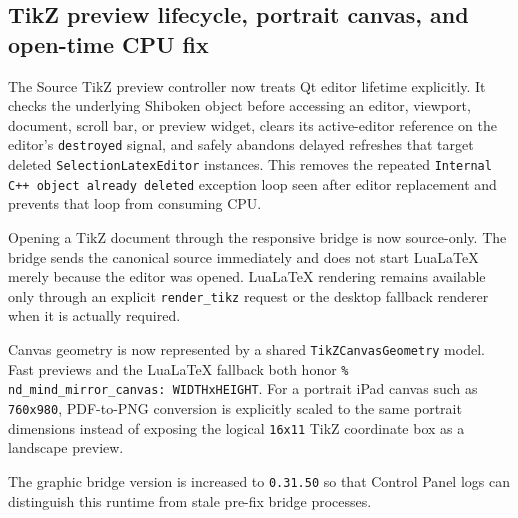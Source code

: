 \documentclass[a4paper]{article}
\title{}
\date{}
\author{Mohammad Rahmani}
\begin{document}
   \maketitle

   \begin{preview}
      \section*{TikZ preview lifecycle, portrait canvas, and open-time CPU fix}

      The Source TikZ preview controller now treats Qt editor lifetime explicitly. It checks the underlying Shiboken object before accessing an editor, viewport, document, scroll bar, or preview widget, clears its active-editor reference on the editor's \texttt{destroyed} signal, and safely abandons delayed refreshes that target deleted \texttt{SelectionLatexEditor} instances. This removes the repeated \texttt{Internal C++ object already deleted} exception loop seen after editor replacement and prevents that loop from consuming CPU.

      Opening a TikZ document through the responsive bridge is now source-only. The bridge sends the canonical source immediately and does not start LuaLaTeX merely because the editor was opened. LuaLaTeX rendering remains available only through an explicit \texttt{render\_tikz} request or the desktop fallback renderer when it is actually required.

      Canvas geometry is now represented by a shared \texttt{TikZCanvasGeometry} model. Fast previews and the LuaLaTeX fallback both honor \texttt{\% nd\_mind\_mirror\_canvas: WIDTHxHEIGHT}. For a portrait iPad canvas such as \texttt{760x980}, PDF-to-PNG conversion is explicitly scaled to the same portrait dimensions instead of exposing the logical \texttt{16x11} TikZ coordinate box as a landscape preview.

      The graphic bridge version is increased to \texttt{0.31.50} so that Control Panel logs can distinguish this runtime from stale pre-fix bridge processes.
   \end{preview}

   
   
\end{document}

